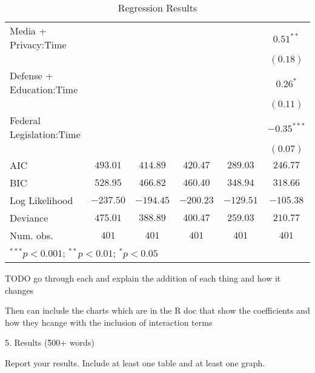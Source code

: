 \documentclass{article}
\begin{document}
\begin{table}[H]
\begin{center}
\begin{tabular}{l c c c c c}
Media + Privacy:Time     &              &               &               &               & $0.51^{**}$   \\
                                                  &              &               &               &               & $(0.18)$      \\
Defense + Education:Time &              &               &               &               & $0.26^{*}$    \\
                                                  &              &               &               &               & $(0.11)$      \\
Federal Legislation:Time &              &               &               &               & $-0.35^{***}$ \\
                                                  &              &               &               &               & $(0.07)$      \\
\hline
AIC                                               & $493.01$     & $414.89$      & $420.47$      & $289.03$      & $246.77$      \\
BIC                                               & $528.95$     & $466.82$      & $460.40$      & $348.94$      & $318.66$      \\
Log Likelihood                                    & $-237.50$    & $-194.45$     & $-200.23$     & $-129.51$     & $-105.38$     \\
Deviance                                          & $475.01$     & $388.89$      & $400.47$      & $259.03$      & $210.77$      \\
Num. obs.                                         & $401$        & $401$         & $401$         & $401$         & $401$         \\
\hline
\multicolumn{6}{l}{\scriptsize{$^{***}p<0.001$; $^{**}p<0.01$; $^{*}p<0.05$}}
\end{tabular}
\caption{Regression Results}
\label{table:coefficients}
\end{center}
\end{table}

TODO go through each and explain the addition of each thing and how it changes

Then can include the charts which are in the R doc that show the coefficients and how they hcange with the inclusion of interaction terms

5. Results (\~500+ words)

Report your results. Include at least one table and at least one graph.
\end{document}
